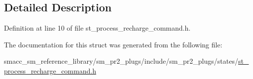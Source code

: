 \subsection{Detailed Description}


Definition at line 10 of file st\+\_\+process\+\_\+recharge\+\_\+command.\+h.



The documentation for this struct was generated from the following file\+:\begin{DoxyCompactItemize}
\item 
smacc\+\_\+sm\+\_\+reference\+\_\+library/sm\+\_\+pr2\+\_\+plugs/include/sm\+\_\+pr2\+\_\+plugs/states/\hyperlink{st__process__recharge__command_8h}{st\+\_\+process\+\_\+recharge\+\_\+command.\+h}\end{DoxyCompactItemize}
